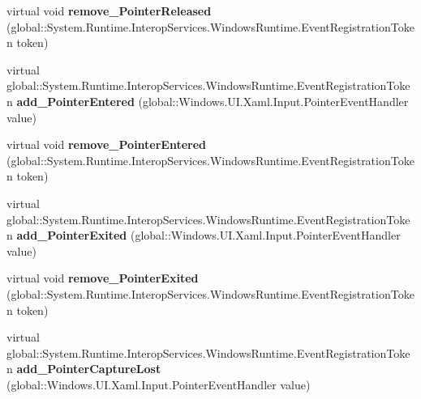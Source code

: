 \begin{DoxyCompactItemize}
\item 
\mbox{\label{class_windows_1_1_u_i_1_1_xaml_1_1_u_i_element_a6b1fe59db3a3dade2439c90e7005d059}} 
virtual void {\bfseries remove\+\_\+\+Pointer\+Released} (global\+::\+System.\+Runtime.\+Interop\+Services.\+Windows\+Runtime.\+Event\+Registration\+Token token)
\item 
\mbox{\label{class_windows_1_1_u_i_1_1_xaml_1_1_u_i_element_a62b58e40180ca9bf1db42ed2d6038c28}} 
virtual global\+::\+System.\+Runtime.\+Interop\+Services.\+Windows\+Runtime.\+Event\+Registration\+Token {\bfseries add\+\_\+\+Pointer\+Entered} (global\+::\+Windows.\+U\+I.\+Xaml.\+Input.\+Pointer\+Event\+Handler value)
\item 
\mbox{\label{class_windows_1_1_u_i_1_1_xaml_1_1_u_i_element_a7f81753f2c0c006e2fa7fc60206ef8fe}} 
virtual void {\bfseries remove\+\_\+\+Pointer\+Entered} (global\+::\+System.\+Runtime.\+Interop\+Services.\+Windows\+Runtime.\+Event\+Registration\+Token token)
\item 
\mbox{\label{class_windows_1_1_u_i_1_1_xaml_1_1_u_i_element_add2a4b911cb6783842ef779b81b58824}} 
virtual global\+::\+System.\+Runtime.\+Interop\+Services.\+Windows\+Runtime.\+Event\+Registration\+Token {\bfseries add\+\_\+\+Pointer\+Exited} (global\+::\+Windows.\+U\+I.\+Xaml.\+Input.\+Pointer\+Event\+Handler value)
\item 
\mbox{\label{class_windows_1_1_u_i_1_1_xaml_1_1_u_i_element_a0371add03a51f168e0d1456bdb3c1130}} 
virtual void {\bfseries remove\+\_\+\+Pointer\+Exited} (global\+::\+System.\+Runtime.\+Interop\+Services.\+Windows\+Runtime.\+Event\+Registration\+Token token)
\item 
\mbox{\label{class_windows_1_1_u_i_1_1_xaml_1_1_u_i_element_a66ebc4d8c8c99a7a0364051b341c48a6}} 
virtual global\+::\+System.\+Runtime.\+Interop\+Services.\+Windows\+Runtime.\+Event\+Registration\+Token {\bfseries add\+\_\+\+Pointer\+Capture\+Lost} (global\+::\+Windows.\+U\+I.\+Xaml.\+Input.\+Pointer\+Event\+Handler value)
\item 

\end{DoxyCompactItemize}
